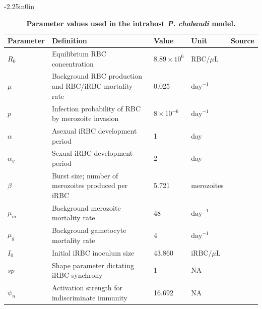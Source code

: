 \documentclass[10pt,letterpaper]{article}
\begin{document}
\begin{table}[!ht]
\begin{adjustwidth}{-2.25in}{0in} %
\centering
\caption{
{\bf Parameter values used in the intrahost \emph{P. chabaudi} model.}}
\begin{tabular}{@{}lllll@{}}
\toprule
Parameter    & Definition                                             & Value     & Unit       & Source \\ \midrule
$R_{0}$    & Equilibrium RBC concentration                          & $8.89 \times 10^6$ & RBC/$\mu$L & \cite{timms_effect_2001}      \\
$\mu$        & Background RBC production and RBC/iRBC mortality rate                     & 0.025                         & $\text{day}^{-1}$   & \cite{miller_quantitative_2010}      \\
\(p\)   & Infection probability of RBC by merozoite invasion                             & $8 \times 10^{-6}$ & $\text{day}^{-1}$       & \cite{mideo_understanding_2008} \\
$\alpha$     & Asexual iRBC development period                        & 1                             & day        & \cite{landau_life_1978}      \\
$\alpha_{g}$ & Sexual iRBC development period                         & 2                             & day        & \cite{gautret_enhanced_1996}      \\
$\beta$      & Burst size; number of merozoites produced per iRBC & 5.721                         & merozoites & \cite{mideo_causes_2011}      \\
$\mu_{m}$    & Background merozoite mortality rate                    & 48                            & $\text{day}^{-1}$   & \cite{mideo_understanding_2008}      \\
$\mu_{g}$    & Background gametocyte mortality rate                   & 4                             & $\text{day}^{-1}$   & \cite{gautret_enhanced_1996}      \\
\(I_{0}\)    & Initial iRBC inoculum size                             & 43.860                      & $\text{iRBC}/\mu$L     & \cite{greischar_predicting_2016}      \\
\(sp\)       & Shape parameter dictating iRBC synchrony               & 1                             & NA         & \cite{greischar_synchrony_2014}    \\
$\psi_{n}$   & Activation strength for indiscriminate immunity        & 16.692                      & NA         & \cite{kamiya_uncovering_2020}      \\

\end{tabular}
\end{adjustwidth}
\end{table}
\end{document}
